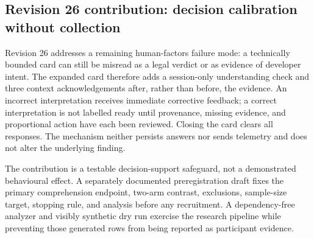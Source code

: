 

\subsection{Revision 26 contribution: decision calibration without collection}

Revision 26 addresses a remaining human-factors failure mode: a technically bounded card can still be misread as a legal verdict or as evidence of developer intent. The expanded card therefore adds a session-only understanding check and three context acknowledgements after, rather than before, the evidence. An incorrect interpretation receives immediate corrective feedback; a correct interpretation is not labelled ready until provenance, missing evidence, and proportional action have each been reviewed. Closing the card clears all responses. The mechanism neither persists answers nor sends telemetry and does not alter the underlying finding.

The contribution is a testable decision-support safeguard, not a demonstrated behavioural effect. A separately documented preregistration draft fixes the primary comprehension endpoint, two-arm contrast, exclusions, sample-size target, stopping rule, and analysis before any recruitment. A dependency-free analyzer and visibly synthetic dry run exercise the research pipeline while preventing those generated rows from being reported as participant evidence.
